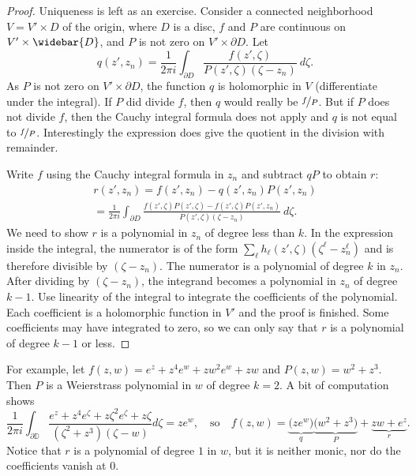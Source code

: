 \documentclass[12pt,openany]{book}
\newcommand{\D}{{\mathbb{D}}}
\theoremstyle{plain}
\theoremstyle{remark}
\theoremstyle{definition}
\theoremstyle{exercise}
\theoremstyle{example}
\begin{document}
\begin{proof}
Uniqueness is left as an exercise.  Consider
a connected neighborhood $V = V' \times D$ of the origin, where
$D$ is a disc,
$f$ and $P$ are continuous on $V' \times \widebar{D}$,
and $P$ is not zero on $V' \times \partial D$.
Let
\begin{equation*}
q(z',z_n) =
\frac{1}{2\pi i} \int_{\partial D} \frac{f(z',\zeta)}{P(z',\zeta)(\zeta-z_n)}
~d\zeta .
\end{equation*}
As $P$ is not zero on $V' \times \partial D$,
the function $q$
is holomorphic in $V$ (differentiate under the integral).
If $P$ did divide $f$, then $q$ would really be $\nicefrac{f}{P}$.
But if $P$ does not divide $f$, then
the Cauchy integral formula does not apply and $q$ is not equal to
$\nicefrac{f}{P}$.  Interestingly
the expression does give the quotient in the division with remainder.

Write $f$ using the Cauchy integral formula in $z_n$ and
subtract $qP$ to obtain $r$:
\begin{multline*}
r(z',z_n) = f(z',z_n) - q(z',z_n)P(z',z_n)
\\
=
\frac{1}{2\pi i}
\int_{\partial D} \frac{f(z',\zeta)P(z',\zeta) - f(z',\zeta)P(z',z_n)}{P(z',\zeta)(\zeta-z_n)}
~d\zeta .
\end{multline*}
We need to show $r$ is a polynomial in $z_n$ of degree less than
$k$.  In the expression inside the integral, the numerator is
of the form $\sum_\ell h_\ell(z',\zeta)(\zeta^\ell-z_n^\ell)$ and is therefore
divisible by $(\zeta-z_n)$.
The numerator is a polynomial of degree $k$ in
$z_n$.  After dividing by $(\zeta-z_n)$,
the integrand becomes
a polynomial in $z_n$ of degree $k-1$.
Use linearity of the integral
to integrate the coefficients of the polynomial.  Each coefficient is a
holomorphic function in $V'$ and the proof is finished.  Some coefficients may have
integrated to zero, so we can only say that $r$ is a polynomial
of degree $k-1$ or less.
\end{proof}

For example, let $f(z,w) = e^z + z^4 e^w + z w^2 e^w + zw$ and $P(z,w)
= w^2 + z^3$.  Then $P$ is a Weierstrass polynomial in $w$ of degree $k=2$.  A bit
of computation shows
\begin{equation*}
\frac{1}{2\pi i}
\int_{\partial \D}
\frac{e^z + z^4 e^{\zeta} + z {\zeta}^2 e^{\zeta} + z \zeta}{(\zeta^2+z^3)(\zeta-w)}
d\zeta
=
z e^w
,
\quad \text{so} \quad
f(z,w) = \underbrace{\bigl( ze^w \bigr)}_{q} \underbrace{\bigl( w^2 + z^3 \bigr)}_{P} +
\underbrace{z w + e^z}_{r} .
\end{equation*}
Notice that $r$ is a polynomial of degree $1$ in $w$, but it is neither monic,
nor do the coefficients vanish at $0$.
\end{document}
